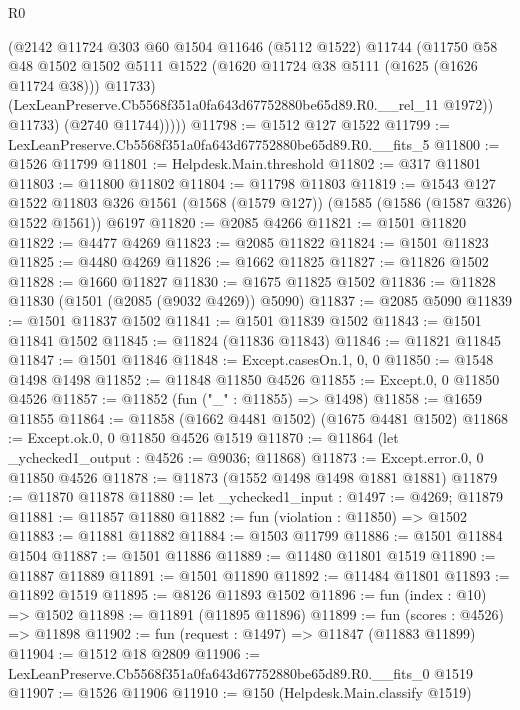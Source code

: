 \begin{lexlean}{R0}
\begin{coremodule}
              (@2142
                @11724
                @303
                @60
                @1504
                @11646
                (@5112 @1522)
                @11744
                (@11750
                  @58
                  @48
                  @1502
                  @1502
                  @5111
                  @1522
                  (@1620 @11724 @38 @5111 (@1625 (@1626 @11724 @38)))
                  @11733)
                (LexLeanPreserve.Cb5568f351a0fa643d67752880be65d89.R0.__rel_11 @1972))
              @11733)
            (@2740 @11744)))))
@11798 := @1512 @127 @1522
@11799 := LexLeanPreserve.Cb5568f351a0fa643d67752880be65d89.R0.__fits_5
@11800 := @1526 @11799
@11801 := Helpdesk.Main.threshold
@11802 := @317 @11801
@11803 := @11800 @11802
@11804 := @11798 @11803
@11819 := @1543
    @127
    @1522
    @11803
    @326
    @1561
    (@1568 (@1579 @127))
    (@1585 (@1586 (@1587 @326) @1522 @1561))
    @6197
@11820 := @2085 @4266
@11821 := @1501 @11820
@11822 := @4477 @4269
@11823 := @2085 @11822
@11824 := @1501 @11823
@11825 := @4480 @4269
@11826 := @1662 @11825
@11827 := @11826 @1502
@11828 := @1660 @11827
@11830 := @1675 @11825 @1502
@11836 := @11828 @11830 (@1501 (@2085 (@9032 @4269)) @5090)
@11837 := @2085 @5090
@11839 := @1501 @11837 @1502
@11841 := @1501 @11839 @1502
@11843 := @1501 @11841 @1502
@11845 := @11824 (@11836 @11843)
@11846 := @11821 @11845
@11847 := @1501 @11846
@11848 := Except.casesOn.{1, 0, 0}
@11850 := @1548 @1498 @1498
@11852 := @11848 @11850 @4526
@11855 := Except.{0, 0} @11850 @4526
@11857 := @11852 (fun ("_" : @11855) => @1498)
@11858 := @1659 @11855
@11864 := @11858 (@1662 @4481 @1502) (@1675 @4481 @1502)
@11868 := Except.ok.{0, 0} @11850 @4526 @1519
@11870 := @11864 (let _ychecked1_output : @4526 := @9036; @11868)
@11873 := Except.error.{0, 0} @11850 @4526
@11878 := @11873 (@1552 @1498 @1498 @1881 @1881)
@11879 := @11870 @11878
@11880 := let _ychecked1_input : @1497 := @4269; @11879
@11881 := @11857 @11880
@11882 := fun (violation : @11850) => @1502
@11883 := @11881 @11882
@11884 := @1503 @11799
@11886 := @1501 @11884 @1504
@11887 := @1501 @11886
@11889 := @11480 @11801 @1519
@11890 := @11887 @11889
@11891 := @1501 @11890
@11892 := @11484 @11801
@11893 := @11892 @1519
@11895 := @8126 @11893 @1502
@11896 := fun (index : @10) => @1502
@11898 := @11891 (@11895 @11896)
@11899 := fun (scores : @4526) => @11898
@11902 := fun (request : @1497) => @11847 (@11883 @11899)
@11904 := @1512 @18 @2809
@11906 := LexLeanPreserve.Cb5568f351a0fa643d67752880be65d89.R0.__fits_0 @1519
@11907 := @1526 @11906
@11910 := @150 (Helpdesk.Main.classify @1519)

\end{coremodule}
\end{lexlean}
